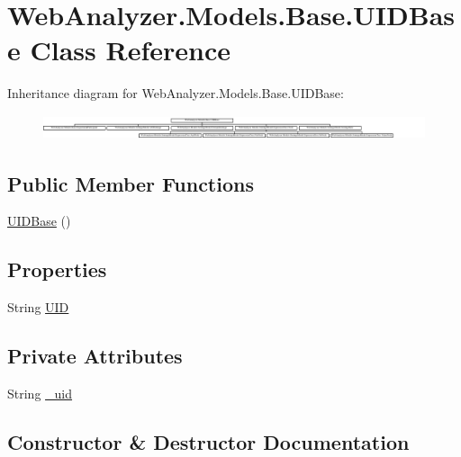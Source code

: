 \hypertarget{class_web_analyzer_1_1_models_1_1_base_1_1_u_i_d_base}{}\section{Web\+Analyzer.\+Models.\+Base.\+U\+I\+D\+Base Class Reference}
\label{class_web_analyzer_1_1_models_1_1_base_1_1_u_i_d_base}
Inheritance diagram for Web\+Analyzer.\+Models.\+Base.\+U\+I\+D\+Base\+:\begin{figure}[H]
\begin{center}
\leavevmode
\includegraphics[height=0.731071cm]{class_web_analyzer_1_1_models_1_1_base_1_1_u_i_d_base}
\end{center}
\end{figure}
\subsection*{Public Member Functions}
\begin{DoxyCompactItemize}
\item 
\hyperlink{class_web_analyzer_1_1_models_1_1_base_1_1_u_i_d_base_af8ee5eded0b2f646e19b26bf3728fea5}{U\+I\+D\+Base} ()
\end{DoxyCompactItemize}
\subsection*{Properties}
\begin{DoxyCompactItemize}
\item 
String \hyperlink{class_web_analyzer_1_1_models_1_1_base_1_1_u_i_d_base_a4ed4a066c028bebd3eb39175965c7d81}{U\+I\+D}
\end{DoxyCompactItemize}
\subsection*{Private Attributes}
\begin{DoxyCompactItemize}
\item 
String \hyperlink{class_web_analyzer_1_1_models_1_1_base_1_1_u_i_d_base_a9b64f6c1cf9fd460888fed19048b9224}{\+\_\+uid}
\end{DoxyCompactItemize}


\subsection{Constructor \& Destructor Documentation}
\hypertarget{class_web_analyzer_1_1_models_1_1_base_1_1_u_i_d_base_af8ee5eded0b2f646e19b26bf3728fea5}{}
